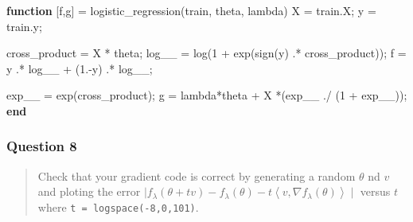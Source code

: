 \documentclass[
]{article}
\newenvironment{Shaded}{}{}
\newcommand{\FloatTok}[1]{\textcolor[rgb]{0.25,0.63,0.44}{#1}}
\newcommand{\KeywordTok}[1]{\textcolor[rgb]{0.00,0.44,0.13}{\textbf{#1}}}
\newcommand{\NormalTok}[1]{#1}
\newcommand{\OperatorTok}[1]{\textcolor[rgb]{0.40,0.40,0.40}{#1}}
\newcommand{\VariableTok}[1]{\textcolor[rgb]{0.10,0.09,0.49}{#1}}
\begin{document}
\begin{Shaded}
\begin{Highlighting}[]
\KeywordTok{function}\NormalTok{ [}\VariableTok{f}\OperatorTok{,}\VariableTok{g}\NormalTok{] }\OperatorTok{=} \VariableTok{logistic\_regression}\NormalTok{(}\VariableTok{train}\OperatorTok{,} \VariableTok{theta}\OperatorTok{,} \VariableTok{lambda}\NormalTok{)}
    \VariableTok{X} \OperatorTok{=} \VariableTok{train}\NormalTok{.}\VariableTok{X}\OperatorTok{;}
    \VariableTok{y} \OperatorTok{=} \VariableTok{train}\NormalTok{.}\VariableTok{y}\OperatorTok{;}

    \VariableTok{cross\_product} \OperatorTok{=} \VariableTok{X}\OperatorTok{\textquotesingle{}} \OperatorTok{*} \VariableTok{theta}\OperatorTok{;}
    \VariableTok{log\_\_} \OperatorTok{=} \VariableTok{log}\NormalTok{(}\FloatTok{1} \OperatorTok{+} \VariableTok{exp}\NormalTok{(}\VariableTok{sign}\NormalTok{(}\VariableTok{y}\NormalTok{) }\OperatorTok{.*} \VariableTok{cross\_product}\NormalTok{))}\OperatorTok{;}
    \VariableTok{f} \OperatorTok{=} \VariableTok{y} \OperatorTok{.*} \VariableTok{log\_\_} \OperatorTok{+}\NormalTok{ (}\FloatTok{1}\NormalTok{.}\OperatorTok{{-}}\VariableTok{y}\NormalTok{) }\OperatorTok{.*} \VariableTok{log\_\_}\OperatorTok{;}
    
    \VariableTok{exp\_\_} \OperatorTok{=} \VariableTok{exp}\NormalTok{(}\VariableTok{cross\_product}\NormalTok{)}\OperatorTok{;}
    \VariableTok{g} \OperatorTok{=} \VariableTok{lambda}\OperatorTok{*}\VariableTok{theta}  \OperatorTok{+} \VariableTok{X} \OperatorTok{*}\NormalTok{(}\VariableTok{exp\_\_} \OperatorTok{./}\NormalTok{ (}\FloatTok{1} \OperatorTok{+} \VariableTok{exp\_\_}\NormalTok{))}\OperatorTok{;}	
\KeywordTok{end}
\end{Highlighting}
\end{Shaded}

\hypertarget{question-8}{%
\subsubsection{Question 8}\label{question-8}}

\begin{quote}
Check that your gradient code is correct by generating a random
\(\theta\) nd \(v\) and ploting the error
\(\mid f_\lambda(\theta+tv)-f_\lambda(\theta) - t\left<v,\nabla f_\lambda(\theta)\right>\mid\)
versus \(t\) where \texttt{t\ =\ logspace(-8,0,101)}.
\end{quote}
\end{document}
